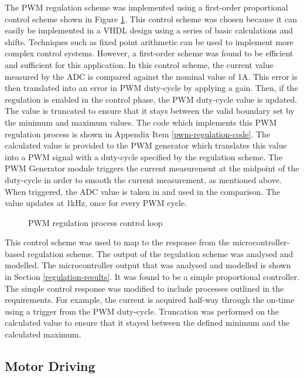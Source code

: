 The PWM regulation scheme was implemented using a first-order proportional control scheme shown in Figure \ref{motor_control_loop}. 
This control scheme was chosen because it can easily be implemented in a VHDL design using a series of basic calculations and shifts. Techniques such as fixed point arithmetic can be used to implement more complex control systems. However, a first-order scheme was found to be efficient and sufficient for this application.
In this control scheme, the current value measured by the ADC is compared against the nominal value of 1A. This error is then translated into an error in PWM duty-cycle by applying a gain. Then, if the regulation is enabled in the control phase, the PWM duty-cycle value is updated. The value is truncated to ensure that it stays between the valid boundary set by the minimum and maximum values. The code which implements this PWM regulation process is shown in Appendix Item \ref{pwm-regulation-code}. The calculated value is provided to the PWM generator which translates this value into a PWM signal with a duty-cycle specified by the regulation scheme. The PWM Generator module triggers the current measurement at the midpoint of the duty-cycle in order to smooth the current measurement, as mentioned above. When triggered, the ADC value is taken in and used in the comparison. The value updates at 1kHz, once for every PWM cycle.


\begin{figure}
    \centering
    
    \caption{PWM regulation process control loop}
    \label{motor_control_loop}
\end{figure}

This control scheme was used to map to the response from the microcontroller-based regulation scheme. The output of the regulation scheme was analysed and modelled. The microcontroller output that was analysed and modelled is shown in Section \ref{regulation-results}. It was found to be a simple proportional controller. The simple control response was modified to include processes outlined in the requirements. For example, the current is acquired half-way through the on-time using a trigger from the PWM duty-cycle. Truncation was performed on the calculated value to ensure that it stayed between the defined minimum and the calculated maximum.

\subsection{Motor Driving}

